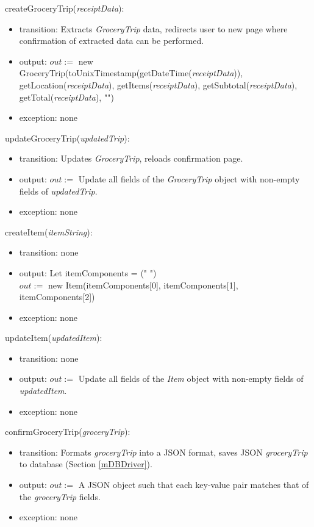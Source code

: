 \documentclass[12pt, titlepage]{article}
\begin{document}
\noindent createGroceryTrip(\textit{receiptData}):
\begin{itemize}
  \item transition: Extracts \textit{GroceryTrip} data, redirects user to new page where confirmation
of extracted data can be performed.
  \item output: $out :=$ new GroceryTrip(toUnixTimestamp(getDateTime(\textit{receiptData})), getLocation(\textit{receiptData}),
                        getItems(\textit{receiptData}), getSubtotal(\textit{receiptData}), getTotal(\textit{receiptData}), "")
  \item exception: none
\end{itemize}

\noindent updateGroceryTrip(\textit{updatedTrip}):
\begin{itemize}
  \item transition: Updates \textit{GroceryTrip}, reloads confirmation page.
  \item output: $out :=$ Update all fields of the \textit{GroceryTrip} object with non-empty fields of \textit{updatedTrip}.
  \item exception: none
\end{itemize}

\noindent createItem(\textit{itemString}):
\begin{itemize}
  \item transition: none
  \item output: Let itemComponents = (" ") \\
                $out :=$ new Item(itemComponents[0], itemComponents[1], itemComponents[2])
  \item exception: none
\end{itemize}

\noindent updateItem(\textit{updatedItem}):
\begin{itemize}
  \item transition: none
  \item output: $out :=$ Update all fields of the \textit{Item} object with non-empty fields of \textit{updatedItem}.
  \item exception: none
\end{itemize}

\noindent confirmGroceryTrip(\textit{groceryTrip}):
\begin{itemize}
  \item transition: Formats \textit{groceryTrip} into a JSON format, saves JSON \textit{groceryTrip} to database (Section \ref{mDBDriver}).
  \item output: $out := $ A JSON object such that each key-value pair matches that of the \textit{groceryTrip}
                fields.
  \item exception: none
\end{itemize}
\end{document}
